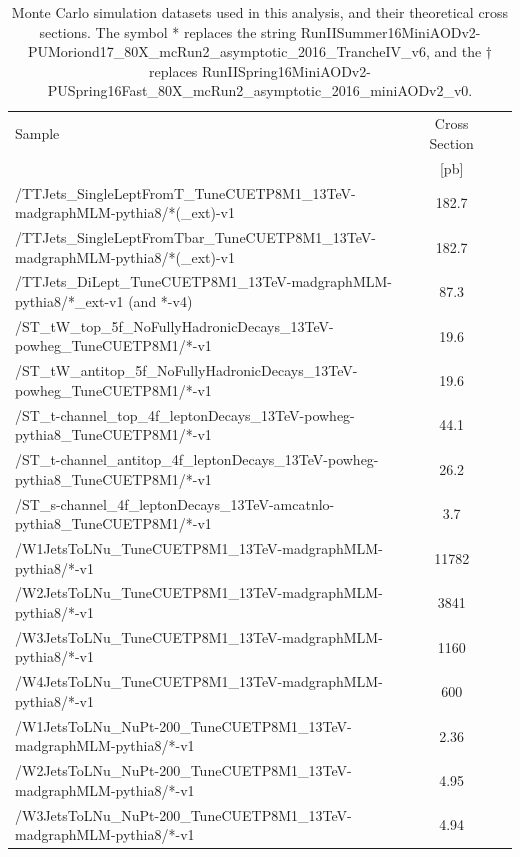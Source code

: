 \begin{table}[htp]
\caption[Monte Carlo simulation datasets used in this analysis, and
  their theoretical cross sections. The symbols * and $\dagger$ replace
  longer strings.]
  {Monte Carlo simulation datasets used in this analysis, and their
  theoretical cross sections. The symbol * replaces the string
  RunIISummer16MiniAODv2-PUMoriond17\_80X\_mcRun2\_asymptotic\_2016\_TrancheIV\_v6, %
  and the $\dagger$ replaces
  RunIISpring16MiniAODv2-PUSpring16Fast\_80X\_mcRun2\_asymptotic\_2016\_miniAODv2\_v0.}
\label{tab:stop:mcsamples}
\centering
{\footnotesize
\begin{tabular}{|l|c|c|c|}
\hline
Sample & Cross Section \\
& [pb] \\
\hline
/TTJets\_SingleLeptFromT\_TuneCUETP8M1\_13TeV-madgraphMLM-pythia8/*(\_ext)-v1 & 182.7 \\
/TTJets\_SingleLeptFromTbar\_TuneCUETP8M1\_13TeV-madgraphMLM-pythia8/*(\_ext)-v1 & 182.7 \\
/TTJets\_DiLept\_TuneCUETP8M1\_13TeV-madgraphMLM-pythia8/*\_ext-v1 (and *-v4) & 87.3 \\
/ST\_tW\_top\_5f\_NoFullyHadronicDecays\_13TeV-powheg\_TuneCUETP8M1/*-v1 & 19.6 \\
/ST\_tW\_antitop\_5f\_NoFullyHadronicDecays\_13TeV-powheg\_TuneCUETP8M1/*-v1 & 19.6 \\
/ST\_t-channel\_top\_4f\_leptonDecays\_13TeV-powheg-pythia8\_TuneCUETP8M1/*-v1 & 44.1 \\
/ST\_t-channel\_antitop\_4f\_leptonDecays\_13TeV-powheg-pythia8\_TuneCUETP8M1/*-v1 & 26.2 \\
/ST\_s-channel\_4f\_leptonDecays\_13TeV-amcatnlo-pythia8\_TuneCUETP8M1/*-v1 & 3.7 \\
/W1JetsToLNu\_TuneCUETP8M1\_13TeV-madgraphMLM-pythia8/*-v1 & 11782  \\
/W2JetsToLNu\_TuneCUETP8M1\_13TeV-madgraphMLM-pythia8/*-v1 & 3841 \\
/W3JetsToLNu\_TuneCUETP8M1\_13TeV-madgraphMLM-pythia8/*-v1 & 1160 \\
/W4JetsToLNu\_TuneCUETP8M1\_13TeV-madgraphMLM-pythia8/*-v1 & 600 \\
/W1JetsToLNu\_NuPt-200\_TuneCUETP8M1\_13TeV-madgraphMLM-pythia8/*-v1 & 2.36  \\
/W2JetsToLNu\_NuPt-200\_TuneCUETP8M1\_13TeV-madgraphMLM-pythia8/*-v1 & 4.95 \\
/W3JetsToLNu\_NuPt-200\_TuneCUETP8M1\_13TeV-madgraphMLM-pythia8/*-v1 & 4.94 \\

\end{tabular}}
\end{table}
